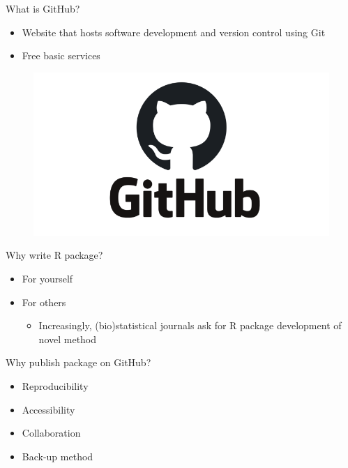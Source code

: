 \documentclass[
  ignorenonframetext,
]{beamer}
\providecommand{\tightlist}{%
  \setlength{\itemsep}{0pt}\setlength{\parskip}{0pt}}
\begin{document}
\begin{frame}{What is GitHub?}
\protect\hypertarget{what-is-github}{}

\begin{itemize}
\tightlist
\item
  Website that hosts software development and version control using Git
\item
  Free basic services
\end{itemize}

\begin{figure}
  \includegraphics[scale=0.2]{slides_files/figure-beamer/GitHub.png}
\end{figure}

\end{frame}

\begin{frame}{Why write R package?}
\protect\hypertarget{why-write-r-package}{}

\begin{itemize}
\tightlist
\item
  For yourself
\item
  For others

  \begin{itemize}
  \tightlist
  \item
    Increasingly, (bio)statistical journals ask for R package
    development of novel method
  \end{itemize}
\end{itemize}

\end{frame}

\begin{frame}{Why publish package on GitHub?}
\protect\hypertarget{why-publish-package-on-github}{}

\begin{itemize}
\tightlist
\item
  Reproducibility
\item
  Accessibility
\item
  Collaboration
\item
  Back-up method
\end{itemize}

\end{frame}
\end{document}
